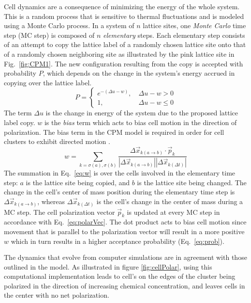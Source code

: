 \documentclass[phys,prelim]{puthesis}
\begin{document}
Cell dynamics are a consequence of minimizing the energy of the whole system. This is a random process that is sensitive to thermal fluctuations and is modeled using a Monte Carlo process. In a system of $n$ lattice sites, one \textit{Monte Carlo} time step (MC step) is composed of $n$ \textit{elementary} steps. Each elementary step consists of an attempt to copy the lattice label of a randomly chosen lattice site onto that of a randomly chosen neighboring site as illustrated by the pink lattice site in Fig.\ \ref{fig:CPM1}. The new configuration resulting from the copy is accepted with probability $P$, which depends on the change in the system's energy accrued in copying over the lattice label.
\begin{equation} \label{eq:prob}
    P =
    \begin{cases}
        e^{-\left( \Delta u - w \right)}, &\ \Delta u - w > 0 \\
        1, &\ \Delta u - w \leq 0
    \end{cases}
\end{equation}
The term $\Delta u$ is the change in energy of the system due to the proposed lattice label copy. $w$ is the \textit{bias} term which acts to bias cell motion in the direction of polarization. The bias term in the CPM model is required in order for cell clusters to exhibit directed motion \cite{szabo2010collective}.
\begin{equation} \label{eq:w}
    w = \sum_{k=\sigma(a),\sigma(b)} \frac{\Delta\vec{x}_{k(a \to b)} \cdot \vec{p}_k}{ |\Delta\vec{x}_{k(a \to b)}| |\Delta\vec{x}_{k(\Delta t)}|}
\end{equation}
The summation in Eq.\ \ref{eq:w} is over the cells involved in the elementary time step: $a$ is the lattice site being copied, and $b$ is the lattice site being changed. The change in the cell's center of mass position during the elementary time step is $\Delta\vec{x}_{k(a \to b)}$, whereas $\Delta\vec{x}_{k(\Delta t)}$ is the cell's change in the center of mass during a MC step. The cell polarization vector $\vec{p}_k$ is updated at every MC step in accordance with Eq.\ \eqref{eq:polarVec}. The dot product acts to bias cell motion since movement that is parallel to the polarization vector will result in a more positive $w$ which in turn results in a higher acceptance probability (Eq.\ \ref{eq:prob}).

The dynamics that evolve from computer simulations are in agreement with those outlined in the model. As illustrated in figure \ref{fig:cellPolar}, using this computational implementation leads to cell's on the edges of the cluster being polarized in the direction of increasing chemical concentration, and leaves cells in the center with no net polarization.
\end{document}
